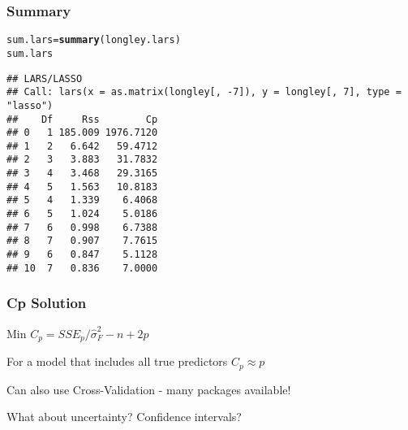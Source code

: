 \documentclass[handout]{beamer}\usepackage[]{graphicx}\usepackage[]{color}
\makeatletter
\newcommand{\hlnum}[1]{\textcolor[rgb]{0.686,0.059,0.569}{#1}}%
\newcommand{\hlopt}[1]{\textcolor[rgb]{0,0,0}{#1}}%
\newcommand{\hlstd}[1]{\textcolor[rgb]{0.345,0.345,0.345}{#1}}%
\newcommand{\hlkwb}[1]{\textcolor[rgb]{0.69,0.353,0.396}{#1}}%
\newcommand{\hlkwc}[1]{\textcolor[rgb]{0.333,0.667,0.333}{#1}}%
\newcommand{\hlkwd}[1]{\textcolor[rgb]{0.737,0.353,0.396}{\textbf{#1}}}%
\newenvironment{kframe}{%
 \def\at@end@of@kframe{}%
 \ifinner\ifhmode%
  \def\at@end@of@kframe{\end{minipage}}%
  \begin{minipage}{\columnwidth}%
 \fi\fi%
 \def\FrameCommand##1{\hskip\@totalleftmargin \hskip-\fboxsep
 \colorbox{shadecolor}{##1}\hskip-\fboxsep
     \hskip-\linewidth \hskip-\@totalleftmargin \hskip\columnwidth}%
 \MakeFramed {\advance\hsize-\width
   \@totalleftmargin\z@ \linewidth\hsize
   \@setminipage}}%
 {\par\unskip\endMakeFramed%
 \at@end@of@kframe}
\newenvironment{knitrout}{}{} %
\makeatother
\begin{document}
\begin{frame}[fragile]
  \frametitle{Summary}
\begin{small}
\begin{knitrout}
\color{fgcolor}\begin{kframe}
\begin{alltt}
\hlstd{sum.lars} \hlkwb{=} \hlkwd{summary}\hlstd{(longley.lars)}
\hlstd{sum.lars}
\end{alltt}
\begin{verbatim}
## LARS/LASSO
## Call: lars(x = as.matrix(longley[, -7]), y = longley[, 7], type = "lasso")
##    Df     Rss        Cp
## 0   1 185.009 1976.7120
## 1   2   6.642   59.4712
## 2   3   3.883   31.7832
## 3   4   3.468   29.3165
## 4   5   1.563   10.8183
## 5   4   1.339    6.4068
## 6   5   1.024    5.0186
## 7   6   0.998    6.7388
## 8   7   0.907    7.7615
## 9   6   0.847    5.1128
## 10  7   0.836    7.0000
\end{verbatim}
\end{kframe}
\end{knitrout}
\end{small}
\end{frame}
\begin{frame}[fragile]
  \frametitle{Cp Solution}
Min $C_p = SSE_p/\hat{\sigma}^2_F - n + 2 p$  \pause

For a model that includes all true predictors $C_p \approx p$

 \pause
Can also use Cross-Validation - many packages available!

 \pause
What about uncertainty?  Confidence intervals?

\end{frame}
\end{document}
